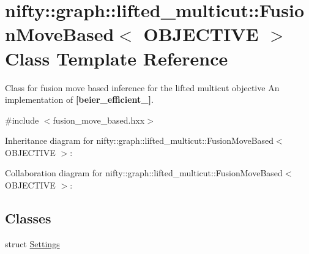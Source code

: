 \hypertarget{classnifty_1_1graph_1_1lifted__multicut_1_1FusionMoveBased}{}\section{nifty\+:\+:graph\+:\+:lifted\+\_\+multicut\+:\+:Fusion\+Move\+Based$<$ O\+B\+J\+E\+C\+T\+I\+V\+E $>$ Class Template Reference}
\label{classnifty_1_1graph_1_1lifted__multicut_1_1FusionMoveBased}


Class for fusion move based inference for the lifted multicut objective An implementation of {\bfseries [beier\+\_\+efficient\+\_]}.  




{\ttfamily \#include $<$fusion\+\_\+move\+\_\+based.\+hxx$>$}



Inheritance diagram for nifty\+:\+:graph\+:\+:lifted\+\_\+multicut\+:\+:Fusion\+Move\+Based$<$ O\+B\+J\+E\+C\+T\+I\+V\+E $>$\+:


Collaboration diagram for nifty\+:\+:graph\+:\+:lifted\+\_\+multicut\+:\+:Fusion\+Move\+Based$<$ O\+B\+J\+E\+C\+T\+I\+V\+E $>$\+:
\subsection*{Classes}
\begin{DoxyCompactItemize}
\item 
struct \hyperlink{structnifty_1_1graph_1_1lifted__multicut_1_1FusionMoveBased_1_1Settings}{Settings}
\end{DoxyCompactItemize}
